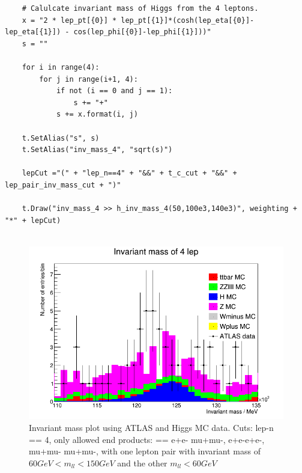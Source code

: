 \begin{lstlisting}
    # Calulcate invariant mass of Higgs from the 4 leptons.
    x = "2 * lep_pt[{0}] * lep_pt[{1}]*(cosh(lep_eta[{0}]-lep_eta[{1}]) - cos(lep_phi[{0}]-lep_phi[{1}]))"
    s = ""

    for i in range(4):
        for j in range(i+1, 4):
            if not (i == 0 and j == 1):
                s += "+"
            s += x.format(i, j)
 
    t.SetAlias("s", s)
    t.SetAlias("inv_mass_4", "sqrt(s)")

    lepCut ="(" + "lep_n==4" + "&&" + t_c_cut + "&&" + lep_pair_inv_mass_cut + ")"
    
    t.Draw("inv_mass_4 >> h_inv_mass_4(50,100e3,140e3)", weighting + "*" + lepCut)
    
\end{lstlisting}

\begin{figure}[h!]
    \centering
	\includegraphics[width=0.85\linewidth]{plots/04-03-2021/14-42.png}
    \caption{Invariant mass plot using ATLAS and Higgs MC data.  Cuts: lep-n == 4, only allowed end products: == e+e- mu+mu-, e+e-e+e-, mu+mu- mu+mu-, with one lepton pair with invariant mass of $60 GeV < m_{ll} < 150 GeV$ and the other $m_{ll} < 60 GeV$}
    \label{fig:14:42_04-03-21}
\end{figure}



